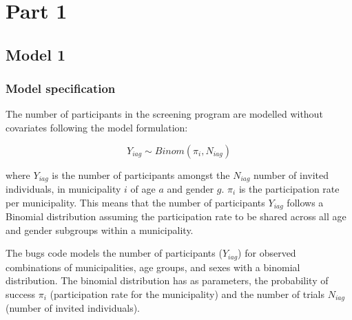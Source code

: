 \documentclass[12pt]{article}
\begin{document}
\section{Part 1}

\subsection{Model 1}

\subsubsection{Model specification}
The number of participants in the screening program are modelled without covariates following the model formulation:

\[
    Y_{iag} \sim Binom(\pi_{i}, N_{iag})
\]

\noindent where $Y_{iag}$ is the number of participants amongst the $N_{iag}$ number of invited individuals, in municipality $i$ of age $a$ and gender $g$. $\pi_{i}$ is the participation rate per municipality. This means that the number of participants $Y_{iag}$ follows a Binomial distribution assuming the participation rate to be shared across all age and gender subgroups within a municipality.


The bugs code models the number of participants ($Y_{iag}$) for observed combinations of municipalities, age groups, and sexes with a binomial distribution. The binomial distribution has as parameters, the probability of success $\pi_i$ (participation rate for the municipality) and the number of trials $N_{iag}$ (number of invited individuals). %


\end{document}
